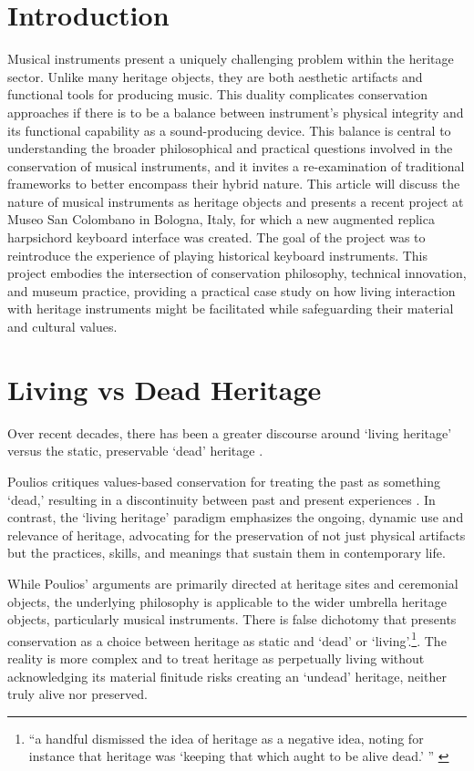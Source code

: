 \section{Introduction}

Musical instruments present a uniquely challenging problem within the heritage sector. Unlike many heritage objects, they are both aesthetic artifacts and functional tools for producing music. This duality complicates conservation approaches if there is to be a balance between instrument's physical integrity and its functional capability as a sound-producing device. This balance is central to understanding the broader philosophical and practical questions involved in the conservation of musical instruments, and it invites a re-examination of traditional frameworks to better encompass their hybrid nature. This article will discuss the nature of musical instruments as heritage objects and presents a recent project at Museo San Colombano in Bologna, Italy, for which a new augmented replica harpsichord keyboard interface was created. The goal of the project was to reintroduce the experience of playing historical keyboard instruments. This project embodies the intersection of conservation philosophy, technical innovation, and museum practice, providing a practical case study on how living interaction with heritage instruments might be facilitated while safeguarding their material and cultural values.

\section{Living vs Dead Heritage}

Over recent decades, there has been a greater discourse around `living heritage' versus the static, preservable `dead' heritage \cite{poulios_moving_2010,smith_uses_2006}. 

Poulios critiques values-based conservation for treating the past as something `dead,' resulting in a discontinuity between past and present experiences \cite{poulios_moving_2010}. In contrast, the `living heritage' paradigm emphasizes the ongoing, dynamic use and relevance of heritage, advocating for the preservation of not just physical artifacts but the practices, skills, and meanings that sustain them in contemporary life.

While Poulios' arguments are primarily directed at heritage sites and ceremonial objects, the underlying philosophy is applicable to the wider umbrella heritage objects, particularly musical instruments. There is false dichotomy that presents conservation as a choice between heritage as static and `dead' or `living'.\footnote{``a handful dismissed the idea of heritage as a negative idea, noting for instance that heritage was `keeping that which aught to be alive dead.' '' \cite{smith_uses_2006}}.
The reality is more complex and to treat heritage as perpetually living without acknowledging its material finitude risks creating an `undead' heritage, neither truly alive nor preserved.

